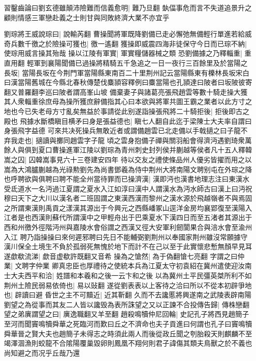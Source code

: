 習鑿齒論曰劉玄德雖顛沛險難而信義愈明|{
	難乃旦翻}
埶偪事危而言不失道追景升之顧則情感三軍戀赴義之士則甘與同敗終濟大業不亦宜乎

劉琮將王威說琮曰|{
	說輸芮翻}
曹操聞將軍既降劉備已走必懈弛無備輕行單進若給威奇兵數千徼之於險操可獲也|{
	徼一遙翻}
獲操即威震四海非徒保守今日而已琮不納|{
	使琮用威言操其殆哉}
操以江陵有軍實|{
	軍實糧儲器械之類}
恐劉備據之乃釋輜重|{
	重直用翻}
輕軍到襄陽聞備已過操將精騎五千急追之一日一夜行三百餘里及於當陽之長坂|{
	當陽長坂在今荆門軍當陽縣東南百二十里荆州記云當陽縣東有櫟林長坂宋白曰漢當陽舊城在今縣北春秋傳楚伐麋頴容釋例曰麋當陽也孔頴達曰陂者曰坂陂彼寄翻又普羅翻李巡曰陂者謂高峯山坡}
備棄妻子與諸葛亮張飛趙雲等數十騎走操大獲其人衆輜重徐庶母為操所獲庶辭備指其心曰本欲與將軍共圖王霸之業者以此方寸之地也今已失老母方寸亂矣無益於事請從此别遂詣操張飛將二十騎拒後|{
	拒後即古之殿也}
飛據水斷橋瞋目横矛曰身是張益德也|{
	瞋七人翻自此迄于梁陳士大夫率自謂曰身張飛字益德}
可來共决死操兵無敢近者或謂備趙雲已北走備以手戟擿之曰子龍不弃我走也|{
	擿讀與擲同趙雲字子龍}
頃之雲身抱備子禪與關羽船會得濟沔遇劉琦衆萬餘人與俱到夏口曹操進軍江陵以劉琮為青州刺史封列侯并蒯越等侯者凡十五人釋韓嵩之囚|{
	囚韓嵩事見六十三卷建安四年}
待以交友之禮使條品州人優劣皆擢而用之以嵩為大鴻臚蒯越為光祿勲劉先為尚書鄧羲為侍中荆州大將南陽文聘别屯在外琮之降也呼聘欲與俱聘曰聘不能全州當待罪而已操濟漢|{
	漢即沔也漢書地理志注曰東漢水受氐道水一名沔過江夏謂之夏水入江如淳曰漢中人謂漢水為沔水師古曰漢上曰沔祝穆曰天下之大川以漢名者二班固謂之東漢西漢而黎州之漢水源於飛越嶺者不與焉固之所謂東漢則禹貢之漾漢其源出于今興元之西縣嶓冢山逕洋金房均襄郢復至漢陽入江者是也西漢則蘇代所謂漢中之甲輕舟出于巴乘夏水下漢四日而至五渚者其源出于西和州徼外徑階沔州與嘉陵水會俗謂之西漢又徑大安軍利劒閬果合與涪水會至渝州入江}
聘乃詣操操曰來何遲邪聘曰先日不能輔弼劉荆州以奉國家荆州雖沒常願據守漢川保全土境生不負於孤弱死無愧於地下而計不在己以至于此實懷悲慙無顏早見耳遂歔欷流涕|{
	歔音虚欷許既翻又音希}
操為之愴然|{
	為于偽翻愴七亮翻}
字謂之曰仲業|{
	文聘字仲業}
卿真忠臣也厚禮待之使統本兵為江夏太守初袁紹在冀州遣使迎汝南士大夫西平和洽|{
	姓譜和本羲和之後一云卞和之後}
以為冀州土平民彊英桀所利不如荆州土險民弱易依倚也|{
	易以䜴翻}
遂從劉表表以上客待之洽曰所以不從本初辟爭地也|{
	辟讀曰避}
昏世之主不可黷近|{
	近其靳翻}
久而不去讒慝將興遂南之武陵表辟南陽劉望之為從事而其友二人皆以讒毁為表所誅望之又以正諫不合投傳告歸|{
	傳株戀翻}
望之弟廙謂望之曰|{
	廙逸職翻又羊至翻}
趙殺鳴犢仲尼回輪|{
	史記孔子將西見趙簡子至河而聞竇鳴犢舜華之死臨河而歎曰丘之不濟命也夫子貢進曰何謂也孔子曰竇鳴犢舜華晉之賢大夫也趙簡子未得志之時須此兩人而後從政丘聞之刳胎殺天則麒麟不至竭澤涸漁則蛟龍不合隂陽覆巢毀卵則鳳凰不翔何則君子諱傷其類夫鳥獸之於不義也尚知避之而况乎丘哉乃還}
